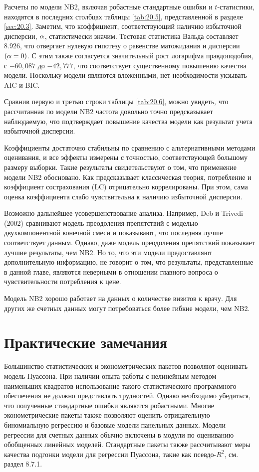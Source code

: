 Расчеты по модели NB2, включая робастные стандартные ошибки и $t$-статистики, находятся в последних столбцах таблицы \ref{tab:20.5}, представленной в разделе \ref{sec:20.3}. Заметим, что коэффициент, соответствующий наличию избыточной дисперсии, $\alpha$, статистически значим.
Тестовая статистика Вальда составляет $8.926$, что отвергает нулевую гипотезу о равенстве матожидания и дисперсии $(\alpha = 0)$. С этим также согласуется значительный рост логарифма правдоподобия, с $-60,087$ до $-42,777$, что соответствует существенному повышению качества модели. Поскольку модели являются вложенными, нет необходимости укзывать AIC и BIC.

Сравнив первую и третью строки таблицы \ref{tab:20.6}, можно увидеть, что рассчитанная по модели NB2 частота довольно точно предсказывает наблюдаемую, что подтверждает повышение качества модели как результат учета избыточной дисперсии.

Коэффициенты достаточно стабильны по сравнению с альтернативными методами оценивания, и все эффекты измерены с точностью, соответствующей большому размеру выборки. Такие результаты свидетельствуют о том, что применение модели NB2 обосновано. Как предсказывает классическая теория, потребление и коэффициент сострахования (LC) отрицательно коррелированы. При этом, сама оценка коэффициента слабо чувствительна к наличию избыточной дисперсии.

Возможно дальнейшее усовершенствование анализа. Например, Deb и Trivedi (2002) сравнивают модель преодоления препятствий с моделью двухкомпонентной конечной смеси и показывают, что последняя лучше соответствует данным. Однако, даже модель преодоления препятствий показывает лучшие результаты, чем NB2. Но то, что эти модели предоставляют дополнительную информацию, не говорит о том, что результаты, представленные в данной главе, являются неверными в отношении главного вопроса о чувствительности потребления к цене.

Модель NB2 хорошо работает на данных о количестве визитов к врачу. Для других же счетных данных могут потребоваться более гибкие модели, чем NB2.




\section{Практические замечания}\label{sec:20.8}

\noindent
Большинство статистических и эконометрических пакетов позволяют оценивать модель Пуассона. При наличии опыта работы с нелинейным методом наименьших квадратов использование такого статистического программного обеспечения не должно представлять трудностей. Однако необходимо убедиться, что полученные стандартные ошибки являются робастными. Многие эконометрические пакеты также позволяют оценить отрицательную биномиальную регрессию и базовые модели панельных данных. Модели регрессии для счетных данных обычно включены в модули по оцениванию обобщенных линейных моделей. Стандартные пакеты также рассчитывают меры качества подгонки модели для регрессии Пуассона, такие как псевдо-$R^2$, см. раздел 8.7.1.

